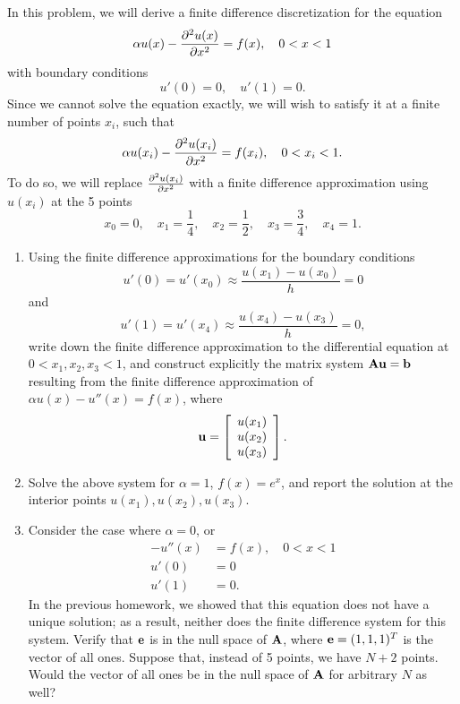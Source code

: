 In this problem, we will derive a finite difference discretization for the equation
\[
\alpha u(x) - \frac{\partial^{2} u(x)}{\partial x^{2}} = f(x), \quad 0<x<1
\]
with boundary conditions
\[
u'(0) = 0, \quad u'(1) = 0.
\]
Since we cannot solve the equation exactly, we will wish to satisfy it at a finite number of points $x_i$, such that
\[
\alpha u(x_i) - \frac{\partial^{2} u(x_i)}{\partial x^{2}} = f(x_i), \quad 0 < x_i < 1.
\]
To do so, we will replace $\frac{\partial^{2} u(x_i)}{\partial x^{2}}$ with a finite difference approximation using $u(x_i)$ at the 5 points 
\[
x_0 = 0, \quad x_1 = \frac{1}{4}, \quad x_2 = \frac{1}{2}, \quad x_3 = \frac{3}{4}, \quad x_4 = 1.
\]
\begin{enumerate}
\item Using the finite difference approximations for the boundary conditions
\[
u'(0) = u'(x_0) \approx \frac{u(x_1)-u(x_0)}{h} = 0
\]
and
\[
u'(1) = u'(x_{4}) \approx \frac{u(x_{4})-u(x_3)}{h} = 0,
\]
write down the finite difference approximation to the differential equation at $0< x_1, x_2, x_3 < 1$, and construct explicitly the matrix system ${\bf A}{\bf u} = {\bf b}$ resulting from the finite difference approximation of $\alpha u(x)-u''(x)=f(x)$, where%
\[
{\bf u} = \left[\begin{array}{c}u(x_1)\\u(x_2)\\u(x_3)\end{array}\right].
\]\item Solve the above system for $\alpha = 1$, $f(x) = e^x$, and report the solution at the interior points $u(x_1), u(x_2), u(x_3)$.  
\item Consider the case where $\alpha = 0$, or
\begin{align*}
-u''(x) &= f(x), \quad 0< x< 1\\
u'(0) &= 0\\
u'(1) &= 0.
\end{align*}
In the previous homework, we showed that this equation does not have a unique solution; as a result, neither does the finite difference system for this system.  Verify that $\bf e$ is in the null space of ${\bf A}$, where ${\bf e} = (1,1,1)^T$ is the vector of all ones.  Suppose that, instead of 5 points, we have $N+2$ points.  Would the vector of all ones be in the null space of ${\bf A}$ for arbitrary $N$ as well?  
\end{enumerate}



